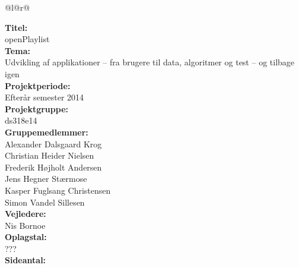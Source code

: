 \pagestyle{titlepagestyle}


\begin{nopagebreak}
{\begin{center}
    \begin{tabular*}{\textwidth}{@{}l@{\extracolsep{\fill}}r@{}}
        \\
        \begin{minipage}[t]{0.49\textwidth}
            \textbf{Titel:}\\
            openPlaylist\\

            \textbf{Tema:}\\
            Udvikling af applikationer – fra brugere til data, algoritmer og test – og tilbage igen\\

            \textbf{Projektperiode:}\\
            Efterår semester 2014\\

            \textbf{Projektgruppe:}\\
            ds318e14\\

            \textbf{Gruppemedlemmer:}\\
            Alexander Dalsgaard Krog\\
            Christian Heider Nielsen\\
            Frederik Højholt Andersen\\
            Jens Hegner Stærmose\\
            Kasper Fuglsang Christensen\\
            Simon Vandel Sillesen\\

            \textbf{Vejledere:}\\
            Nis Bornoe\\

            \textbf{Oplagstal:}\\
            ???\\

            \textbf{Sideantal:}\\
            \pageref{LastPage}\\ 


\end{minipage}
\end{tabular*}
\end{center}}
\end{nopagebreak}
